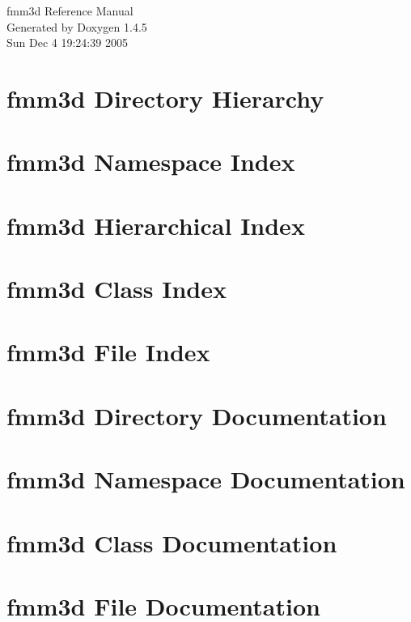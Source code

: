 \documentclass[a4paper]{book}
\begin{document}
\begin{titlepage}
\vspace*{7cm}
\begin{center}
{\Large fmm3d Reference Manual}\\
\vspace*{1cm}
{\large Generated by Doxygen 1.4.5}\\
\vspace*{0.5cm}
{\small Sun Dec 4 19:24:39 2005}\\
\end{center}
\end{titlepage}
\clearemptydoublepage
{}
\tableofcontents
\clearemptydoublepage
{}
\chapter{fmm3d Directory Hierarchy}

\chapter{fmm3d Namespace Index}

\chapter{fmm3d Hierarchical Index}

\chapter{fmm3d Class Index}

\chapter{fmm3d File Index}

\chapter{fmm3d Directory Documentation}

\chapter{fmm3d Namespace Documentation}

\chapter{fmm3d Class Documentation}









\chapter{fmm3d File Documentation}



















\printindex
\end{document}
